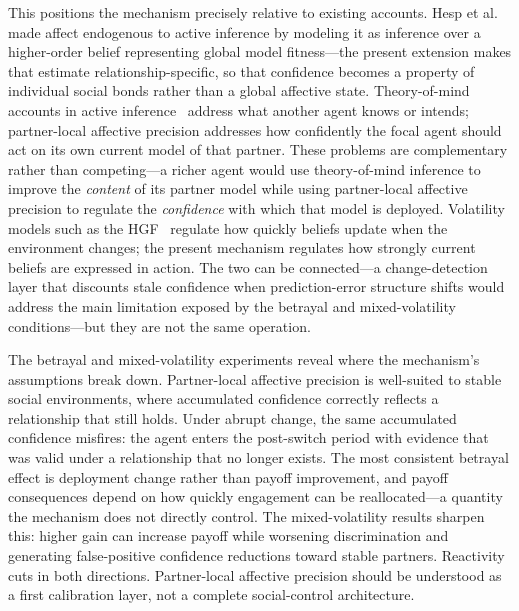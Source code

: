 This positions the mechanism precisely relative to existing accounts. Hesp et al.\ \cite{Hesp2021DeeplyFeltAffect} made affect endogenous to active inference by modeling it as inference over a higher-order belief representing global model fitness---the present extension makes that estimate relationship-specific, so that confidence becomes a property of individual social bonds rather than a global affective state. Theory-of-mind accounts in active inference~\cite{Pitliya2025ToMActiveInference} address what another agent knows or intends; partner-local affective precision addresses how confidently the focal agent should act on its own current model of that partner. These problems are complementary rather than competing---a richer agent would use theory-of-mind inference to improve the \emph{content} of its partner model while using partner-local affective precision to regulate the \emph{confidence} with which that model is deployed. Volatility models such as the HGF~\cite{Mathys2011HGF} regulate how quickly beliefs update when the environment changes; the present mechanism regulates how strongly current beliefs are expressed in action. The two can be connected---a change-detection layer that discounts stale confidence when prediction-error structure shifts would address the main limitation exposed by the betrayal and mixed-volatility conditions---but they are not the same operation.

The betrayal and mixed-volatility experiments reveal where the mechanism's assumptions break down. Partner-local affective precision is well-suited to stable social environments, where accumulated confidence correctly reflects a relationship that still holds. Under abrupt change, the same accumulated confidence misfires: the agent enters the post-switch period with evidence that was valid under a relationship that no longer exists. The most consistent betrayal effect is deployment change rather than payoff improvement, and payoff consequences depend on how quickly engagement can be reallocated---a quantity the mechanism does not directly control. The mixed-volatility results sharpen this: higher gain can increase payoff while worsening discrimination and generating false-positive confidence reductions toward stable partners. Reactivity cuts in both directions. Partner-local affective precision should be understood as a first calibration layer, not a complete social-control architecture.

